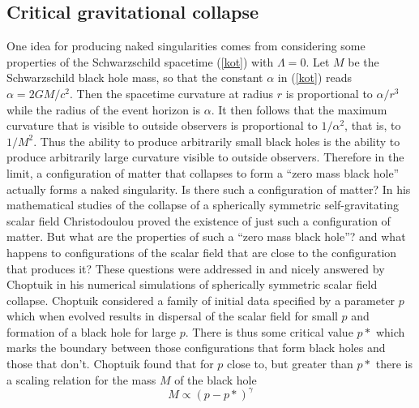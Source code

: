 \documentclass[12pt]{iopart}
\begin{document}
\subsection{Critical gravitational collapse}

One idea for producing naked singularities comes from considering some properties of the Schwarzschild spacetime (\ref{kot}) with $\Lambda =0$.  Let $M$ be the Schwarzschild black hole mass, so that the constant $\alpha$ in (\ref{kot}) reads $\alpha =2 GM/c^2$.  Then the spacetime curvature at radius $r$ is proportional to $\alpha/{r^3}$ while the radius of the event horizon is  $\alpha$.  It then follows that the maximum curvature that is visible to outside observers is proportional to $1/\alpha^{2}$, that is, to $1/{M^2}$.  Thus the ability to produce arbitrarily small black holes is the ability to produce arbitrarily large curvature visible to outside observers.  Therefore in the limit, a configuration of matter that collapses to form a ``zero mass black hole'' actually forms a naked singularity.  Is there such a configuration of matter?  In his mathematical studies of the collapse of a spherically symmetric self-gravitating scalar field \cite{Chrcrit} Christodoulou proved the existence of just such a configuration of matter.  But what are the properties of such a ``zero mass black hole''? and what happens to configurations of the scalar field that are close to the configuration that produces it?  These questions were addressed in \cite{Ch,Chris} and nicely answered by Choptuik \cite{Choptuik} in his numerical simulations of spherically symmetric scalar field collapse.  Choptuik considered a family of initial data specified by a parameter $p$ which when evolved results in dispersal of the scalar field for small $p$ and formation of a black hole for large $p$.  There is thus some critical value $p*$ which marks the boundary between those configurations that form black holes and those that don't.  Choptuik found that for $p$ close to, but greater than $p*$ there is a scaling relation for the mass $M$ of the black hole
\begin{equation}
M \propto {(p-p*)}^\gamma
\label{Chopmass}
\end{equation} 
\end{document}

